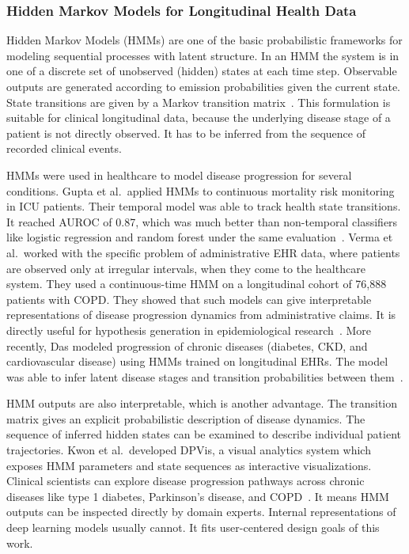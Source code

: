 \subsubsection{Hidden Markov Models for Longitudinal Health Data}
\label{subsec:hmm_ehr}

Hidden Markov Models (HMMs) are one of the basic probabilistic frameworks for modeling sequential processes with latent structure. In an HMM the system is in one of a discrete set of unobserved (hidden) states at each time step. Observable outputs are generated according to emission probabilities given the current state. State transitions are given by a Markov transition matrix~\cite{rabiner1989hmm}. This formulation is suitable for clinical longitudinal data, because the underlying disease stage of a patient is not directly observed. It has to be inferred from the sequence of recorded clinical events.

HMMs were used in healthcare to model disease progression for several conditions. Gupta et al.\ applied HMMs to continuous mortality risk monitoring in ICU patients. Their temporal model was able to track health state transitions. It reached AUROC of 0.87, which was much better than non-temporal classifiers like logistic regression and random forest under the same evaluation~\cite{gupta2020hmm}. Verma et al.\ worked with the specific problem of administrative EHR data, where patients are observed only at irregular intervals, when they come to the healthcare system. They used a continuous-time HMM on a longitudinal cohort of 76,888 patients with COPD. They showed that such models can give interpretable representations of disease progression dynamics from administrative claims. It is directly useful for hypothesis generation in epidemiological research~\cite{verma2018copd}. More recently, Das modeled progression of chronic diseases (diabetes, CKD, and cardiovascular disease) using HMMs trained on longitudinal EHRs. The model was able to infer latent disease stages and transition probabilities between them~\cite{das2025hmm}.

HMM outputs are also interpretable, which is another advantage. The transition matrix gives an explicit probabilistic description of disease dynamics. The sequence of inferred hidden states can be examined to describe individual patient trajectories. Kwon et al.\ developed DPVis, a visual analytics system which exposes HMM parameters and state sequences as interactive visualizations. Clinical scientists can explore disease progression pathways across chronic diseases like type 1 diabetes, Parkinson's disease, and COPD~\cite{kwon2020dpvis}. It means HMM outputs can be inspected directly by domain experts. Internal representations of deep learning models usually cannot. It fits user-centered design goals of this work.

